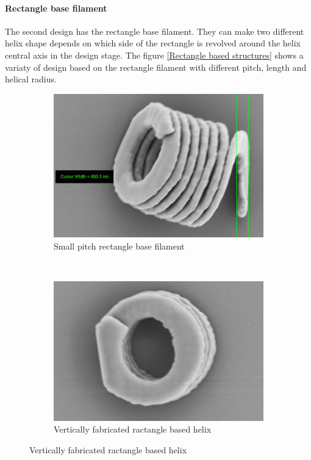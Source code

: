 \documentclass[12pt,a4paper,titlepage]{report}
\begin{document}
\paragraph{Rectangle base filament}

The second design has the rectangle base filament. They can make two different helix shape depends on which side of
the rectangle is revolved around the helix central axis in the design stage. The
 figure \ref{Rectangle based structures} shows a variaty of design
based on the rectangle filament with different pitch, length and helical radius.



\begin{figure}
        \centering
        \begin{subfigure}[b]{0.49\textwidth}
                \includegraphics[width=\textwidth]{Cursor}
                \caption{Small pitch rectangle base filament}
                \label{Rectangle base filament}
        \end{subfigure}~
       \begin{subfigure}[b]{0.505\textwidth}
                \includegraphics[width=\textwidth]{vertical-rentanglebased}
                \caption{Vertically fabricated ractangle based helix}
                \label{vertical-rentanglebased}
        \end{subfigure}


\end{figure}
\end{document}
